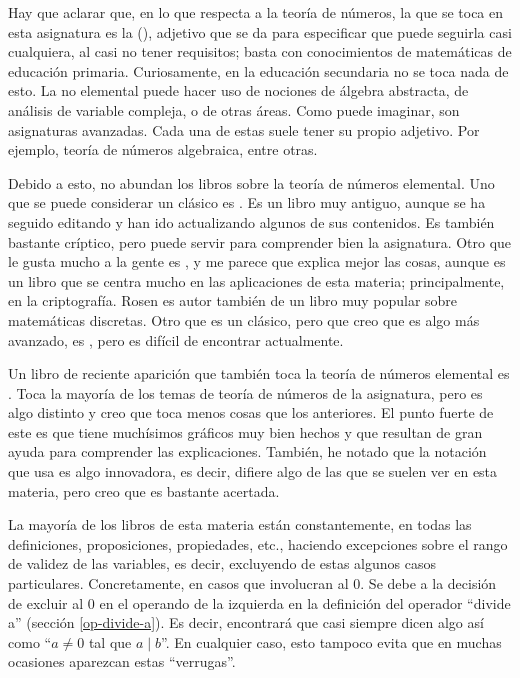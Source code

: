 




Hay que aclarar que, en lo que respecta a la teoría de números, la que se
toca en esta asignatura es la  (), adjetivo
que se da para especificar que puede seguirla casi cualquiera, al casi no
tener requisitos; basta con conocimientos de matemáticas de educación
primaria. Curiosamente, en la educación secundaria no se toca nada de esto.
La no elemental puede hacer uso de nociones de álgebra abstracta, de
análisis de variable compleja, o de otras áreas. Como puede imaginar, son
asignaturas avanzadas. Cada una de estas suele tener su propio adjetivo. Por
ejemplo, teoría de números algebraica, entre otras.

Debido a esto, no abundan los libros sobre la teoría de números elemental.
Uno que se puede considerar un clásico es \cite{burton}. Es un libro muy
antiguo, aunque se ha seguido editando y han ido actualizando algunos de sus
contenidos. Es también bastante críptico, pero puede servir para comprender
bien la asignatura. Otro que le gusta mucho a la gente es \cite{rosen}, y me
parece que explica mejor las cosas, aunque es un libro que se centra mucho
en las aplicaciones de esta materia; principalmente, en la criptografía.
Rosen es autor también de un libro muy popular sobre matemáticas discretas.
Otro que es un clásico, pero que creo que es algo más avanzado, es
\cite{theory-of-numbers-niven}, pero es difícil de encontrar actualmente.

Un libro de reciente aparición que también toca la teoría de números
elemental es \cite{weissman}. Toca la mayoría de los temas de
teoría de números de la asignatura, pero es algo distinto y creo que toca
menos cosas que los anteriores. El punto fuerte de este es que tiene
muchísimos gráficos muy bien hechos y que resultan de gran ayuda para
comprender las explicaciones. También, he notado que la notación que usa es
algo innovadora, es decir, difiere algo de las que se suelen ver en esta
materia, pero creo que es bastante acertada.

La mayoría de los libros de esta materia están constantemente, en todas las
definiciones, proposiciones, propiedades, etc., haciendo excepciones sobre
el rango de validez de las variables, es decir, excluyendo de estas algunos
casos particulares. Concretamente, en casos que involucran al 0. Se debe a
la decisión de excluir al 0 en el operando de la izquierda en la definición
del operador ``divide a'' (sección \ref{op-divide-a}). Es decir, encontrará
que casi siempre dicen algo así como ``$a \neq 0$ tal que $a \mid b$''. En
cualquier caso, esto tampoco evita que en muchas ocasiones aparezcan estas
``verrugas''.

